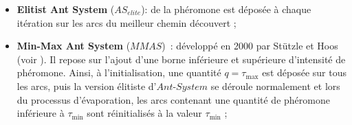 \begin{itemize}
 \item \textbf{Elitist Ant System} ($AS_{elite}$): de la phéromone est déposée à chaque itération sur les arcs du meilleur chemin découvert ;
 
 \item \textbf{Min-Max Ant System} ($MMAS$)~: développé en 2000 par Stützle et Hoos (voir \cite{Stutzle2000}). Il repose sur l'ajout d'une borne inférieure et supérieure d'intensité de phéromone. Ainsi, à l'initialisation, une quantité $q=\tau_{\text{max}}$ est déposée sur tous les arcs, puis la version élitiste d'$Ant$-$System$ se déroule normalement et lors du processus d'évaporation, les arcs contenant une quantité de phéromone inférieure à $\tau_{\text{min}}$ sont réinitialisés à la valeur $\tau_{\text{min}}$ ;
 

\end{itemize}
